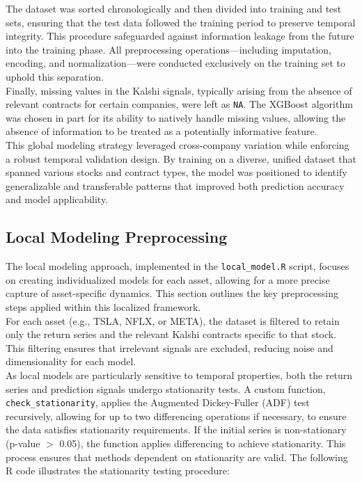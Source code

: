 \documentclass[12pt]{report}
\begin{document}
The dataset was sorted chronologically and then divided into training and test sets, ensuring that the test data followed the training period to preserve temporal integrity. This procedure safeguarded against information leakage from the future into the training phase. All preprocessing operations—including imputation, encoding, and normalization—were conducted exclusively on the training set to uphold this separation.\\

Finally, missing values in the Kalshi signals, typically arising from the absence of relevant contracts for certain companies, were left as \texttt{NA}. The XGBoost algorithm was chosen in part for its ability to natively handle missing values, allowing the absence of information to be treated as a potentially informative feature.\\

This global modeling strategy leveraged cross-company variation while enforcing a robust temporal validation design. By training on a diverse, unified dataset that spanned various stocks and contract types, the model was positioned to identify generalizable and transferable patterns that improved both prediction accuracy and model applicability.


\subsection{Local Modeling Preprocessing}
The local modeling approach, implemented in the \texttt{local\_model.R} script, focuses on creating individualized models for each asset, allowing for a more precise capture of asset-specific dynamics. This section outlines the key preprocessing steps applied within this localized framework.\\

For each asset (e.g., TSLA, NFLX, or META), the dataset is filtered to retain only the return series and the relevant Kalshi contracts specific to that stock. This filtering ensures that irrelevant signals are excluded, reducing noise and dimensionality for each model.\\

As local models are particularly sensitive to temporal properties, both the return series and prediction signals undergo stationarity tests. A custom function, \texttt{check\_stationarity}, applies the Augmented Dickey-Fuller (ADF) test recursively, allowing for up to two differencing operations if necessary, to ensure the data satisfies stationarity requirements. If the initial series is non-stationary (p-value \(>\) 0.05), the function applies differencing to achieve stationarity. This process ensures that methods dependent on stationarity are valid. The following R code illustrates the stationarity testing procedure:\\
\end{document}
